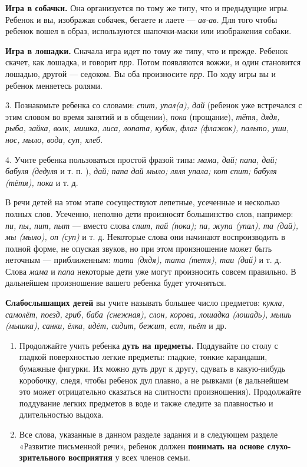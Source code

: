 \documentclass[a5paper]{book}
\renewcommand{\emph}[1]{\textit{#1}}
\begin{document}
\textbf{Игра в собачки.} Она организуется по тому же типу, что и
предыдущие игры. Ребенок и вы, изображая собачек, бегаете и лаете ---
\emph{ав-ав.} Для того чтобы ребенок вошел в образ, используются
шапочки-маски или изображения собаки.

\textbf{Игра в лошадки.} Сначала игра идет по тому же типу, что и
прежде. Ребенок скачет, как лошадка, и говорит \emph{прр.} Потом
появляются вожжи, и один становится лошадью, другой --- седоком. Вы оба
произносите \emph{прр.} По ходу игры вы и ребенок меняетесь ролями.

3. Познакомьте ребенка со словами: \emph{спит, упал(а), дай} (ребенок
уже встречался с этим словом во время занятий и в общении), \emph{пока}
(прощание), \emph{тётя, дядя, рыба, зайка, волк, мишка, лиса, лопата,
кубик, флаг (флажок), пальто, уши, нос, мыло, вода, суп, хлеб.}

4. Учите ребенка пользоваться простой фразой типа: \emph{мама, дай;
папа, дай; бабуля (дедуля} и т. п. ), \emph{дай; папа дай мыло; ляля
упала; кот спит; бабуля (тётя), пока} и т. д.

В речи детей на этом этапе сосуществуют лепетные, усеченные и несколько
полных слов. Усеченно, неполно дети произносят большинство слов,
например: \emph{пи, пы, пит, пыт} --- вместо слова \emph{спит, пай
(пока); па, жупа (упал), та (дай), мы (мыло), оп (суп)} и т. д.
Некоторые слова они начинают воспроизводить в полной форме, не опуская
звуков, но при этом произношение может быть неточным --- приближенным:
\emph{тата (дядя), тата (тетя), таи (дай)} и т. д. Слова \emph{мама} и
\emph{папа} некоторые дети уже могут произносить совсем правильно. В
дальнейшем произношение вашего ребенка будет уточняться.

\textbf{Слабослышащих детей} вы учите называть большее число предметов:
\emph{кукла, самолёт, поезд, гриб, баба (снежная), слон, корова, лошадка
(лошадь), мышь (мышка), санки, ёлка, идёт, сидит, бежит, ест, пьёт} и
др.


\begin{enumerate}
\def\labelenumi{\arabic{enumi}.}
\setcounter{enumi}{3}
\item
  
  Продолжайте учить ребенка \textbf{дуть на предметы.} Поддувайте по
  столу с гладкой поверхностью легкие предметы: гладкие, тонкие
  карандаши, бумажные фигурки. Их можно дуть друг к другу, сдувать в
  какую-нибудь коробочку, следя, чтобы ребенок дул плавно, а не рывками
  (в дальнейшем это может отрицательно сказаться на слитности
  произношения). Продолжайте поддувание легких предметов в воде и также
  следите за плавностью и длительностью выдоха.
  
\item
  
  Все слова, указанные в данном разделе задания и в следующем разделе
  «Развитие письменной речи», ребенок должен \textbf{понимать на основе
  слухо-зрительного восприятия} у всех членов семьи.
  
\end{enumerate}
\end{document}

